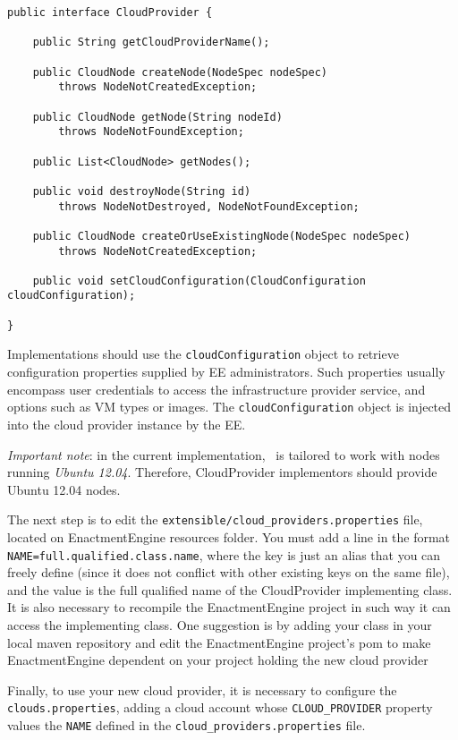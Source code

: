 {\footnotesize
\begin{lstlisting}[caption=\textsf{CloudProvider} interface., label=lst:cloud_provider]
public interface CloudProvider {

    public String getCloudProviderName();

    public CloudNode createNode(NodeSpec nodeSpec) 
    	throws NodeNotCreatedException;

    public CloudNode getNode(String nodeId) 
    	throws NodeNotFoundException;

    public List<CloudNode> getNodes();

    public void destroyNode(String id) 
    	throws NodeNotDestroyed, NodeNotFoundException;

    public CloudNode createOrUseExistingNode(NodeSpec nodeSpec) 
    	throws NodeNotCreatedException;

    public void setCloudConfiguration(CloudConfiguration cloudConfiguration);

}
\end{lstlisting}
}

Implementations should use the \texttt{cloudConfiguration} object to retrieve 
configuration properties supplied by EE administrators. Such properties usually encompass
user credentials to access the infrastructure provider service, and options
such as VM types or images. The \texttt{cloudConfiguration} object is injected
into the cloud provider instance by the EE.

\emph{Important note}: in the current implementation, \ee\ is tailored to work with nodes running \emph{Ubuntu 12.04}. Therefore, \textsf{CloudProvider} implementors should provide Ubuntu 12.04 nodes. 

The next step is to edit the \texttt{extensible/cloud\_providers.properties} file, located on EnactmentEngine resources folder. You must add a line in the format \verb!NAME=full.qualified.class.name!, where the key is just an alias that you can freely define (since it does not conflict with other existing keys on the same file), and the value is the full qualified name of the \textsf{CloudProvider} implementing class. It is also necessary to recompile the EnactmentEngine project in such way it can access the implementing class. One suggestion is by adding your class in your local maven repository and edit the EnactmentEngine project's pom to make EnactmentEngine dependent on your project holding the new cloud provider

Finally, to use your new cloud provider, it is necessary to configure the \texttt{clouds.properties},
adding a cloud account whose \verb!CLOUD_PROVIDER! property values the \verb!NAME! defined in the \texttt{cloud\_providers.properties} file.


